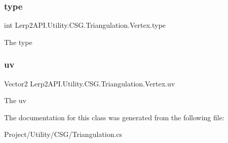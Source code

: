 \subsubsection{\texorpdfstring{type}{type}}
{\footnotesize\ttfamily int Lerp2\+A\+P\+I.\+Utility.\+C\+S\+G.\+Triangulation.\+Vertex.\+type}



The type 

\mbox{\label{class_lerp2_a_p_i_1_1_utility_1_1_c_s_g_1_1_triangulation_1_1_vertex_adfd4c78b3837a6c55e6edf9f1ea3176d}} 
\subsubsection{\texorpdfstring{uv}{uv}}
{\footnotesize\ttfamily Vector2 Lerp2\+A\+P\+I.\+Utility.\+C\+S\+G.\+Triangulation.\+Vertex.\+uv}



The uv 



The documentation for this class was generated from the following file\+:\begin{DoxyCompactItemize}
\item 
Project/\+Utility/\+C\+S\+G/Triangulation.\+cs\end{DoxyCompactItemize}
